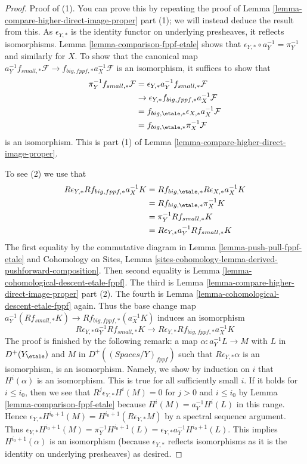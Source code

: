 \begin{proof}
Proof of (1). You can prove this by repeating the proof of
Lemma \ref{lemma-compare-higher-direct-image-proper} part (1);
we will instead deduce the result from this.
As $\epsilon_{Y, *}$ is the identity functor on underlying presheaves,
it reflects isomorphisms. Lemma \ref{lemma-comparison-fppf-etale}
shows that $\epsilon_{Y, *} \circ a_Y^{-1} = \pi_Y^{-1}$
and similarly for $X$. To show that the canonical map
$a_Y^{-1}f_{small, *}\mathcal{F} \to f_{big, fppf, *}a_X^{-1}\mathcal{F}$
is an isomorphism, it suffices to show that
\begin{align*}
\pi_Y^{-1}f_{small, *}\mathcal{F}
& =
\epsilon_{Y, *}a_Y^{-1}f_{small, *}\mathcal{F} \\
& \to 
\epsilon_{Y, *}f_{big, fppf, *}a_X^{-1}\mathcal{F} \\
& =
f_{big, \etale, *} \epsilon_{X, *}a_X^{-1}\mathcal{F} \\
& =
f_{big, \etale, *}\pi_X^{-1}\mathcal{F}
\end{align*}
is an isomorphism. This is part
(1) of Lemma \ref{lemma-compare-higher-direct-image-proper}.

\medskip\noindent
To see (2) we use that
\begin{align*}
R\epsilon_{Y, *}Rf_{big, fppf, *}a_X^{-1}K
& =
Rf_{big, \etale, *}R\epsilon_{X, *}a_X^{-1}K \\
& =
Rf_{big, \etale, *}\pi_X^{-1}K \\
& =
\pi_Y^{-1}Rf_{small, *}K \\
& =
R\epsilon_{Y, *} a_Y^{-1}Rf_{small, *}K
\end{align*}
The first equality by the commutative diagram in
Lemma \ref{lemma-push-pull-fppf-etale}
and Cohomology on Sites, Lemma
\ref{sites-cohomology-lemma-derived-pushforward-composition}.
Then second equality is Lemma \ref{lemma-cohomological-descent-etale-fppf}.
The third is
Lemma \ref{lemma-compare-higher-direct-image-proper} part (2).
The fourth is Lemma \ref{lemma-cohomological-descent-etale-fppf} again.
Thus the base change map
$a_Y^{-1}(Rf_{small, *}K) \to Rf_{big, fppf, *}(a_X^{-1}K)$
induces an isomorphism
$$
R\epsilon_{Y, *}a_Y^{-1}Rf_{small, *}K \to
R\epsilon_{Y, *}Rf_{big, fppf, *}a_X^{-1}K
$$
The proof is finished by the following remark: a map
$\alpha : a_Y^{-1}L \to M$ with $L$ in $D^+(Y_\etale)$
and $M$ in $D^+((\textit{Spaces}/Y)_{fppf})$ such that
$R\epsilon_{Y, *}\alpha$ is an isomorphism, is an isomorphism. Namely, 
we show by induction on $i$ that $H^i(\alpha)$ is an isomorphism.
This is true for all sufficiently small $i$.
If it holds for $i \leq i_0$, then we see that
$R^j\epsilon_{Y, *}H^i(M) = 0$ for $j > 0$ and $i \leq i_0$
by Lemma \ref{lemma-comparison-fppf-etale}
because $H^i(M) = a_Y^{-1}H^i(L)$ in this range.
Hence $\epsilon_{Y, *}H^{i_0 + 1}(M) = H^{i_0 + 1}(R\epsilon_{Y, *}M)$
by a spectral sequence argument.
Thus $\epsilon_{Y, *}H^{i_0 + 1}(M) = \pi_Y^{-1}H^{i_0 + 1}(L) =
\epsilon_{Y, *}a_Y^{-1}H^{i_0 + 1}(L)$.
This implies $H^{i_0 + 1}(\alpha)$ is an isomorphism
(because $\epsilon_{Y, *}$ reflects isomorphisms as it is the
identity on underlying presheaves) as desired.
\end{proof}

